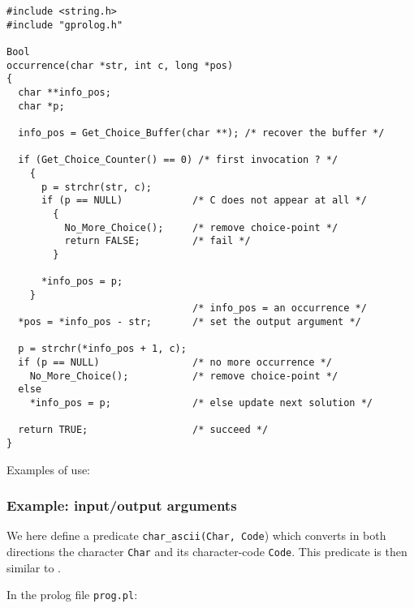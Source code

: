 \begin{Indentation}
\begin{verbatim}
#include <string.h>
#include "gprolog.h"

Bool
occurrence(char *str, int c, long *pos)
{
  char **info_pos;
  char *p;

  info_pos = Get_Choice_Buffer(char **); /* recover the buffer */

  if (Get_Choice_Counter() == 0) /* first invocation ? */
    {
      p = strchr(str, c);
      if (p == NULL)            /* C does not appear at all */
        {
          No_More_Choice();     /* remove choice-point */
          return FALSE;         /* fail */
        }

      *info_pos = p;
    }
                                /* info_pos = an occurrence */
  *pos = *info_pos - str;       /* set the output argument */

  p = strchr(*info_pos + 1, c);
  if (p == NULL)                /* no more occurrence */
    No_More_Choice();           /* remove choice-point */
  else
    *info_pos = p;              /* else update next solution */

  return TRUE;                  /* succeed */
}
\end{verbatim}
\end{Indentation}

Examples of use:

\begin{CodeTwoCols}
\SkipLine
{}
\SkipLine
{}
\SkipLine
{}
\SkipLine
{}
\end{CodeTwoCols}

\subsubsection{Example: input/output arguments}
We here define a predicate \texttt{char\_ascii(Char, Code}) which converts
in both directions the character \texttt{Char} and its character-code
\texttt{Code}. This predicate is then similar to 
.

In the prolog file \texttt{prog.pl}:



